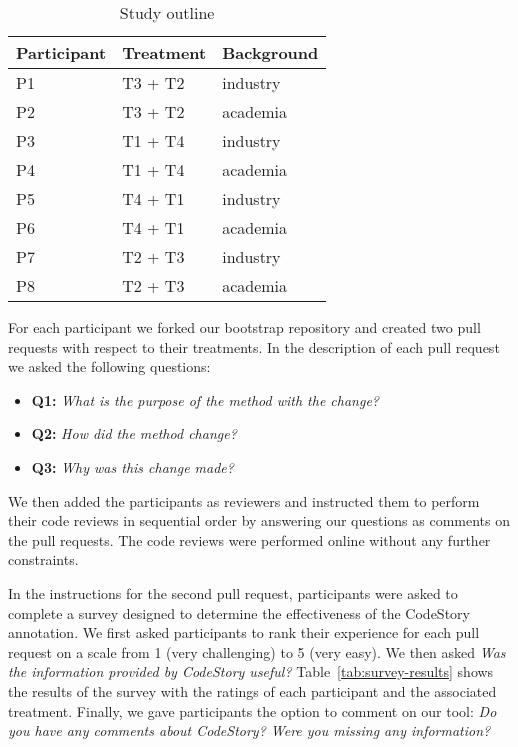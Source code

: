 \documentclass[../manifest.tex]{subfiles}
\begin{document}
\begin{table}[t]
    \centering
    \begin{tabular}{lll}
    \hline
    \textbf{Participant} & \textbf{Treatment} & \textbf{Background} \\
    \hline
    P1 & T3 + T2 & industry \\
    P2 & T3 + T2 & academia \\
    P3 & T1 + T4 & industry \\
    P4 & T1 + T4 & academia \\
    P5 & T4 + T1 & industry \\
    P6 & T4 + T1 & academia \\
    P7 & T2 + T3 & industry \\
    P8 & T2 + T3 & academia \\
    \hline
    \end{tabular}
    \caption{Study outline}
    \label{tab:study-outline}
\end{table}

For each participant we forked our bootstrap repository and created two pull requests with respect to their treatments. In the description of each pull request we asked the following questions:
\begin{itemize}
  \item \textbf{Q1:} \textit{What is the purpose of the method with the change?}
  \item \textbf{Q2:} \textit{How did the method change?}
  \item \textbf{Q3:} \textit{Why was this change made?}
\end{itemize}

We then added the participants as reviewers and instructed them to perform their code reviews in sequential order by answering our questions as comments on the pull requests. The code reviews were performed online without any further constraints.

In the instructions for the second pull request, participants were asked to complete a survey designed to determine the effectiveness of the CodeStory annotation. We first asked participants to rank their experience for each pull request on a scale from 1 (very challenging) to 5 (very easy). We then asked \textit{Was the information provided by CodeStory useful?} Table~\ref{tab:survey-results} shows the results of the survey with the ratings of each participant and the associated treatment. Finally, we gave participants the option to comment on our tool: \textit{Do you have any comments about CodeStory? Were you missing any information?}
\end{document}
